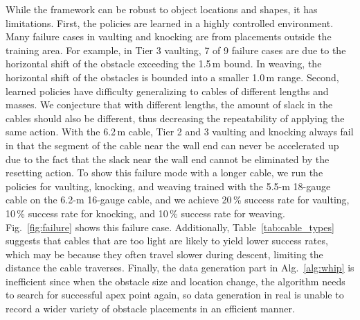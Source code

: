 While the framework can be robust to object locations and shapes, it has limitations. First, the policies are learned in a highly controlled environment. %
Many failure cases in vaulting and knocking are from %
placements outside the training area. For example, in Tier 3 vaulting, 7 of 9 failure cases are due to the horizontal shift of the obstacle exceeding the 1.5\,m bound. In weaving, the horizontal shift of the obstacles is bounded into a smaller 1.0\,m range.%
%
Second, learned policies have difficulty generalizing to cables of different lengths and masses. We conjecture that with different lengths, the amount of slack in the cables should also be different, thus decreasing the repeatability of applying the same action. With the 6.2\,m cable, Tier 2 and 3 vaulting and knocking always fail in that the segment of the cable near the wall end can never be accelerated up due to the fact that the slack near the wall end cannot be eliminated by the resetting action.
To show this failure mode with a longer cable, we run the policies for vaulting, knocking, and weaving trained with the 5.5-m 18-gauge cable on the 6.2-m 16-gauge cable, and we achieve 20\,\% success rate for vaulting, 10\,\% success rate for knocking, and 10\,\% success rate for weaving. Fig.~\ref{fig:failure} shows this failure case. Additionally, Table~\ref{tab:cable_types} suggests that cables that are too light are likely to yield lower success rates, which may be because they often travel slower during descent, limiting the distance the cable traverses. Finally, the data generation part in Alg.~\ref{alg:whip} is inefficient since when the obstacle size and location change, the algorithm needs to search for successful apex point again, so data generation in real is unable to record a wider variety of obstacle placements in an efficient manner.


